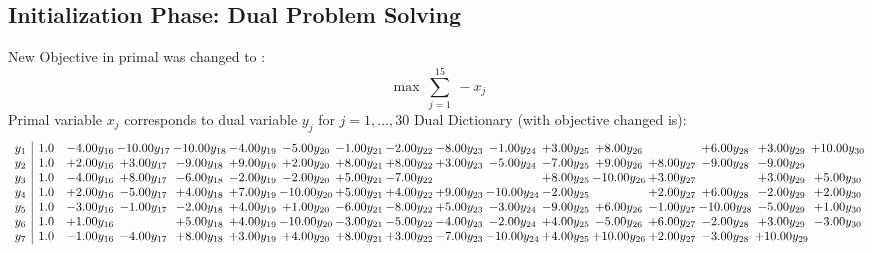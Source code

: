 \documentclass[9pt]{article}
\begin{document}
\subsection{Initialization Phase: Dual Problem Solving}
New Objective in primal was changed to : \[ \max\ \sum_{j=1}^{15}\ - x_j \] 
Primal variable $x_j$ corresponds to dual variable $y_j$ for $j = 1,\ldots,30$
Dual Dictionary (with objective changed is): 
\[\begin{array}{c| c c@{\hskip 2pt} c@{\hskip 2pt} c@{\hskip 2pt} c@{\hskip 2pt} c@{\hskip 2pt} c@{\hskip 2pt} c@{\hskip 2pt} c@{\hskip 2pt} c@{\hskip 2pt} c@{\hskip 2pt} c@{\hskip 2pt} c@{\hskip 2pt} c@{\hskip 2pt} c@{\hskip 2pt} c@{\hskip 2pt} }
 y_{1}   &  1.0 & -4.00 y_{16} & -10.00 y_{17} & -10.00 y_{18} & -4.00 y_{19} & -5.00 y_{20} & -1.00 y_{21} & -2.00 y_{22} & -8.00 y_{23} & -1.00 y_{24} & +  3.00 y_{25} & +  8.00 y_{26} &   & +  6.00 y_{28} & +  3.00 y_{29} & + 10.00 y_{30}\\
 y_{2}   &  1.0 & +  2.00 y_{16} & +  3.00 y_{17} & -9.00 y_{18} & +  9.00 y_{19} & +  2.00 y_{20} & +  8.00 y_{21} & +  8.00 y_{22} & +  3.00 y_{23} & -5.00 y_{24} & -7.00 y_{25} & +  9.00 y_{26} & +  8.00 y_{27} & -9.00 y_{28} & -9.00 y_{29} &   \\
 y_{3}   &  1.0 & -4.00 y_{16} & +  8.00 y_{17} & -6.00 y_{18} & -2.00 y_{19} & -2.00 y_{20} & +  5.00 y_{21} & -7.00 y_{22} &    &   & +  8.00 y_{25} & -10.00 y_{26} & +  3.00 y_{27} &   & +  3.00 y_{29} & +  5.00 y_{30}\\
 y_{4}   &  1.0 & +  2.00 y_{16} & -5.00 y_{17} & +  4.00 y_{18} & +  7.00 y_{19} & -10.00 y_{20} & +  5.00 y_{21} & +  4.00 y_{22} & +  9.00 y_{23} & -10.00 y_{24} & -2.00 y_{25} &   & +  2.00 y_{27} & +  6.00 y_{28} & -2.00 y_{29} & +  2.00 y_{30}\\
 y_{5}   &  1.0 & -3.00 y_{16} & -1.00 y_{17} & -2.00 y_{18} & +  4.00 y_{19} & +  1.00 y_{20} & -6.00 y_{21} & -8.00 y_{22} & +  5.00 y_{23} & -3.00 y_{24} & -9.00 y_{25} & +  6.00 y_{26} & -1.00 y_{27} & -10.00 y_{28} & -5.00 y_{29} & +  1.00 y_{30}\\
 y_{6}   &  1.0 & +  1.00 y_{16} &   & +  5.00 y_{18} & +  4.00 y_{19} & -10.00 y_{20} & -3.00 y_{21} & -5.00 y_{22} & -4.00 y_{23} & -2.00 y_{24} & +  4.00 y_{25} & -5.00 y_{26} & +  6.00 y_{27} & -2.00 y_{28} & +  3.00 y_{29} & -3.00 y_{30}\\
 y_{7}   &  1.0 & -1.00 y_{16} & -4.00 y_{17} & +  8.00 y_{18} & +  3.00 y_{19} & +  4.00 y_{20} & +  8.00 y_{21} & +  3.00 y_{22} & -7.00 y_{23} & -10.00 y_{24} & +  4.00 y_{25} & + 10.00 y_{26} & +  2.00 y_{27} & -3.00 y_{28} & + 10.00 y_{29} &   \\

\end{array}\]
\end{document}
